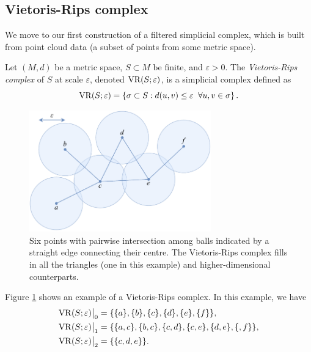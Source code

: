 \subsection{Vietoris-Rips complex}

We move to our first construction of a filtered simplicial complex, which is built from point cloud data (a subset of points from some metric space).

\begin{definition}
    Let $(M, d)$ be a metric space, $S \subset M$ be finite, and $\varepsilon > 0$. The \emph{Vietoris-Rips complex} of $S$ at scale $\varepsilon$, denoted $\operatorname{VR}(S; \varepsilon)$, is a simplicial complex defined as
    \[
        \operatorname{VR}(S; \varepsilon) = \left\{
        \sigma \subset S: d(u, v) \leq \varepsilon \;\; \forall u, v \in \sigma
        \right\}.
    \]
\end{definition}

\begin{figure}
    \centering
    \includegraphics[width=0.7\textwidth]{content/2-background/images/vietoris-rips}
    \caption{Six points with pairwise intersection among balls indicated by a straight edge connecting their centre. The Vietoris-Rips complex fills in all the triangles (one in this example) and higher-dimensional counterparts.}
    \label{fig:vietoris-rips-complex}
\end{figure}

\begin{example}
    Figure \ref{fig:vietoris-rips-complex} shows an example of a Vietoris-Rips complex. In this example, we have
    \begin{align*}
        \restr{\vr(S; \varepsilon)}0 & = \{ \{a\}, \{b\}, \{c\}, \{d\}, \{e\}, \{f\}\},             \\
        \restr{\vr(S; \varepsilon)}1 & = \{ \{a,c\}, \{b,c\}, \{c,d\}, \{c,e\}, \{d,e\}, \{,f\}\}, \\
        \restr{\vr(S; \varepsilon)}2 & = \{ \{c,d,e\} \}.
    \end{align*}
\end{example}

